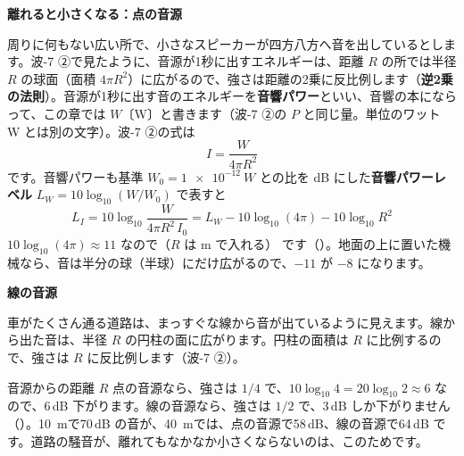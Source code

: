 \noindent\textbf{離れると小さくなる：点の音源}\par\nobreak
周りに何もない広い所で、小さなスピーカーが四方八方へ音を出しているとします。波-7 ②で見たように、音源が1秒に出すエネルギーは、距離 $R$ の所では半径 $R$ の球面（面積 $4\pi R^2$）に広がるので、強さは距離の2乗に反比例します（\textbf{逆2乗の法則}）。音源が1秒に出す音のエネルギーを\textbf{音響パワー}といい、音響の本にならって、この章では $W$〔W〕と書きます（波-7 ②の $P$ と同じ量。単位のワット W とは別の文字）。波-7 ②の式は
\[ I=\frac{W}{4\pi R^2} \]
です。音響パワーも基準 $W_0=\qty{1e-12}{W}$ との比を dB にした\textbf{音響パワーレベル} $L_W=10\log_{10}(W/W_0)$ で表すと
\[ L_I=10\log_{10}\frac{W}{4\pi R^2\,I_0}=L_W-10\log_{10}(4\pi)-10\log_{10}R^2 \]
$10\log_{10}(4\pi)\approx11$ なので（$R$ は m で入れる）
です（）。地面の上に置いた機械なら、音は半分の球（半球）にだけ広がるので、$-11$ が $-8$ になります。

\noindent\textbf{線の音源}\par\nobreak
車がたくさん通る道路は、まっすぐな線から音が出ているように見えます。線から出た音は、半径 $R$ の円柱の面に広がります。円柱の面積は $R$ に比例するので、強さは $R$ に反比例します（波-7 ②）。

\begin{phbaisuru}{音源からの距離 $R$}
点の音源なら、強さは $1/4$ で、$10\log_{10}4=20\log_{10}2\approx6$ なので、6\,dB 下がります。線の音源なら、強さは $1/2$ で、3\,dB しか下がりません（）。\qty{10}{m}で70\,dB の音が、\qty{40}{m}では、点の音源で58\,dB、線の音源で64\,dB です。道路の騒音が、離れてもなかなか小さくならないのは、このためです。
\par\vspace{2pt}\centering
{}
\end{phbaisuru}

